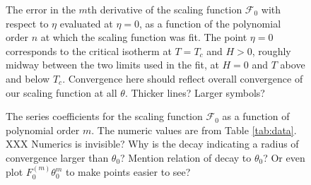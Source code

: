 \documentclass[
aps,
pre,
preprint,
longbibliography,
floatfix
]{revtex4-2}
\begin{document}
\begin{figure}
  \caption{
    The error in the $m$th derivative of the scaling function $\mathcal F_0$
    with respect to $\eta$ evaluated at $\eta=0$, as a function of the
    polynomial order $n$ at which the scaling function was fit. The point
    $\eta=0$ corresponds to the critical isotherm at $T=T_c$ and $H>0$, roughly
    midway between the two limits used in the fit, at $H=0$ and $T$ above and below $T_c$. Convergence here should reflect overall convergence of our scaling function at all $\theta$. {\color{blue} Thicker lines? Larger symbols?}
  } \label{fig:error}
\end{figure}



\begin{figure}
  \caption{
    The series coefficients for the scaling function $\mathcal F_0$ as a
    function of polynomial order $m$. The numeric values are from Table
    \ref{tab:data}. {\color{blue} XXX Numerics is invisible? Why is the decay indicating a radius of convergence larger than $\theta_0$? Mention relation of decay to $\theta_0$? Or even plot $F_0^{(m)} \theta_0^m$ to make points easier to see?}
  } \label{fig:phi.series}
\end{figure}
\end{document}
